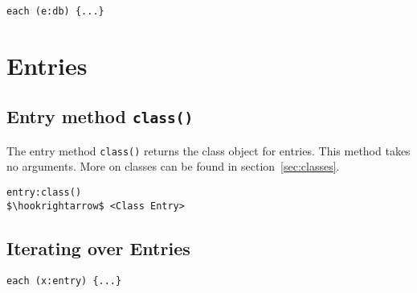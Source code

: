 \documentclass[11pt,a4paper]{scrbook}
\begin{document}

\begin{lstlisting}[language=BibTool,mathescape=true]
each (e:db) {...}
\end{lstlisting}

\section{Entries}


\subsection{Entry method \texttt{class()}}

The entry method \texttt{class()} returns the class object for entries. This
method takes no arguments. More on classes can be found in
section~\ref{sec:classes}.

\begin{lstlisting}[language=BibTool,mathescape=true]
entry:class()
$\hookrightarrow$ <Class Entry>
\end{lstlisting}

\subsection{Iterating over Entries}


\begin{lstlisting}[language=BibTool,mathescape=true]
each (x:entry) {...}
\end{lstlisting}
\end{document}

